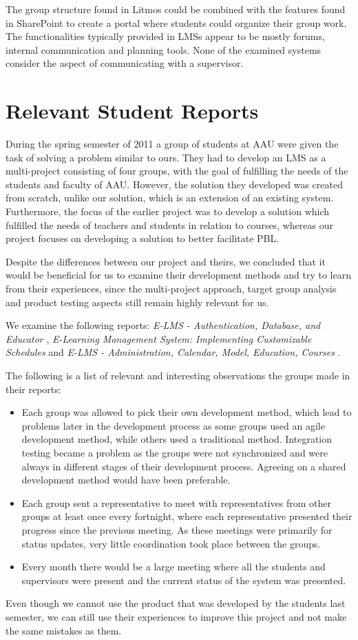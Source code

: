 The group structure found in Litmos could be combined with the features found in SharePoint to create a portal where students could organize their group work.
The functionalities typically provided in LMSs appear to be mostly forums, internal communication and planning tools.
None of the examined systems consider the aspect of communicating with a supervisor.

\section{Relevant Student Reports}
\label{sec:prevwork}
During the spring semester of 2011 a group of students at AAU were given the task of solving a problem similar to ours. 
They had to develop an LMS as a multi-project consisting of four groups, with the goal of fulfilling the needs of the students and faculty of AAU.
However, the solution they developed was created from scratch, unlike our solution, which is an extension of an existing system.
Furthermore, the focus of the earlier project was to develop a solution which fulfilled the needs of teachers and students in relation to courses, whereas our project focuses on developing a solution to better facilitate PBL.

Despite the differences between our project and theirs, we concluded that it would be beneficial for us to examine their development methods and try to learn from their experiences, since the multi-project approach, target group analysis and product testing aspects still remain highly relevant for us. 

We examine the following reports: \emph{E-LMS - Authentication, Database, and Educator} \cite{E-LMS-ADE},  \emph{E-Learning Management System: Implementing Customizable Schedules} \cite{E-LMS-ICS} and \emph{E-LMS - Administration, Calendar, Model, Education, Courses} \cite{E-LMS-ACMEC}.

The following is a list of relevant and interesting observations the groups made in their reports:
\begin{itemize}
	\item{Each group was allowed to pick their own development method, which lead to problems later in the development process as some groups used an agile development method, while others used a traditional method. 
	Integration testing became a problem as the groups were not synchronized and were always in different stages of their development process. 
	Agreeing on a shared development method would have been preferable.}
	\item{Each group sent a representative to meet with representatives from other groups at least once every fortnight, where each representative presented their progress since the previous meeting. 
	As these meetings were primarily for status updates, very little coordination took place between the groups.}
	\item{Every month there would be a large meeting where all the students and supervisors were present and the current status of the system was presented.}
\end{itemize}

Even though we cannot use the product that was developed by the students last semester, we can still use their experiences to improve this project and not make the same mistakes as them.
